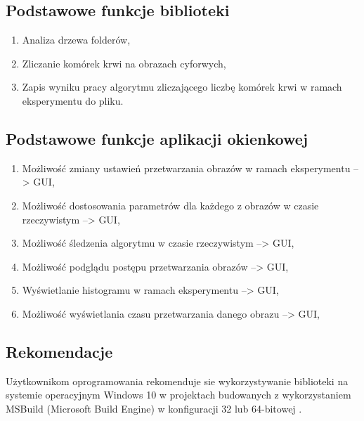 \documentclass{article}
\begin{document}
        \newpage
        \subsection{Podstawowe funkcje biblioteki}
        {
            \Large
            \quad
            \begin{enumerate}
                \item Analiza drzewa folderów,
                \item Zliczanie komórek krwi na obrazach cyforwych,
                \item Zapis wyniku pracy algorytmu zliczającego liczbę komórek krwi w ramach eksperymentu do pliku.
            \end{enumerate}
        }

        \subsection{Podstawowe funkcje aplikacji okienkowej}
        {
            \Large
            \quad
            \begin{enumerate}
                \item Możliwość zmiany ustawień przetwarzania obrazów w ramach eksperymentu --> GUI,
                \item Możliwość dostosowania parametrów dla każdego z obrazów w czasie rzeczywistym --> GUI,
                \item Możliwość śledzenia algorytmu w czasie rzeczywistym --> GUI,
                \item Możliwość podglądu postępu przetwarzania obrazów --> GUI,
                \item Wyświetlanie histogramu w ramach eksperymentu --> GUI,
                \item Możliwość wyświetlania czasu przetwarzania danego obrazu --> GUI,
            \end{enumerate}
        }

        \subsection{Rekomendacje}
        {
            \Large
            \justifying
            \quad
            Użytkownikom oprogramowania rekomenduje sie wykorzystywanie biblioteki na systemie operacyjnym Windows 10 w projektach budowanych z wykorzystaniem MSBuild (Microsoft Build Engine) w konfiguracji 32 lub 64-bitowej \cite{msdocsmsbuild}.
        }
\end{document}
